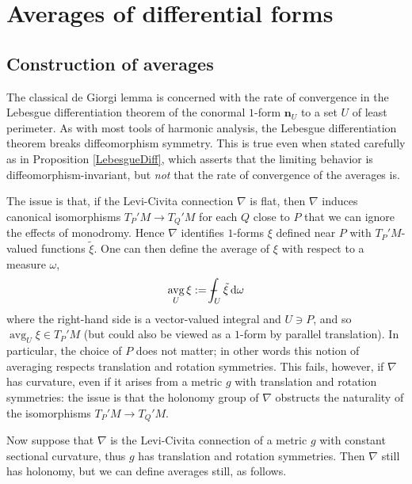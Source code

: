 \documentclass[reqno,10pt]{amsart}
\DeclareMathOperator{\avg}{avg}
\newcommand*\dif{\mathop{}\!\mathrm{d}}
\newcommand{\normal}{\mathbf n}
\theoremstyle{definition}
\numberwithin{equation}{section}
\def\Xint#1{\mathchoice
{\XXint\displaystyle\textstyle{#1}}%
{\XXint\textstyle\scriptstyle{#1}}%
{\XXint\scriptstyle\scriptscriptstyle{#1}}%
{\XXint\scriptscriptstyle\scriptscriptstyle{#1}}%
\!\int}
\def\XXint#1#2#3{{\setbox0=\hbox{$#1{#2#3}{\int}$ }
\vcenter{\hbox{$#2#3$ }}\kern-.6\wd0}}
\def\dashint{\Xint-}
\begin{document}
\section{Averages of differential forms}\label{excess section}
\subsection{Construction of averages}
The classical de Giorgi lemma is concerned with the rate of convergence in the Lebesgue differentiation theorem of the conormal $1$-form $\normal_U$ to a set $U$ of least perimeter.
As with most tools of harmonic analysis, the Lebesgue differentiation theorem breaks diffeomorphism symmetry.
This is true even when stated carefully as in Proposition \ref{LebesgueDiff}, which asserts that the limiting behavior is diffeomorphism-invariant, but \emph{not} that the rate of convergence of the averages is.

The issue is that, if the Levi-Civita connection $\nabla$ is flat, then $\nabla$ induces canonical isomorphisms $T_P'M \to T_Q'M$ for each $Q$ close to $P$ that we can ignore the effects of monodromy.
Hence $\nabla$ identifies $1$-forms $\xi$ defined near $P$ with $T_P'M$-valued functions $\tilde \xi$.
One can then define the average of $\xi$ with respect to a measure $\omega$,
\begin{equation}\label{averages and flat connections}
\avg_U \xi := \dashint_U \tilde \xi \dif \omega
\end{equation}
where the right-hand side is a vector-valued integral and $U \ni P$, and so $\avg_U \xi \in T_P'M$ (but could also be viewed as a $1$-form by parallel translation).
In particular, the choice of $P$ does not matter; in other words this notion of averaging respects translation and rotation symmetries.
This fails, however, if $\nabla$ has curvature, even if it arises from a metric $g$ with translation and rotation symmetries: the issue is that the holonomy group of $\nabla$ obstructs the naturality of the isomorphisms $T_P'M \to T_Q'M$.

Now suppose that $\nabla$ is the Levi-Civita connection of a metric $g$ with constant sectional curvature, thus $g$ has translation and rotation symmetries.
Then $\nabla$ still has holonomy, but we can define averages still, as follows.
\end{document}
